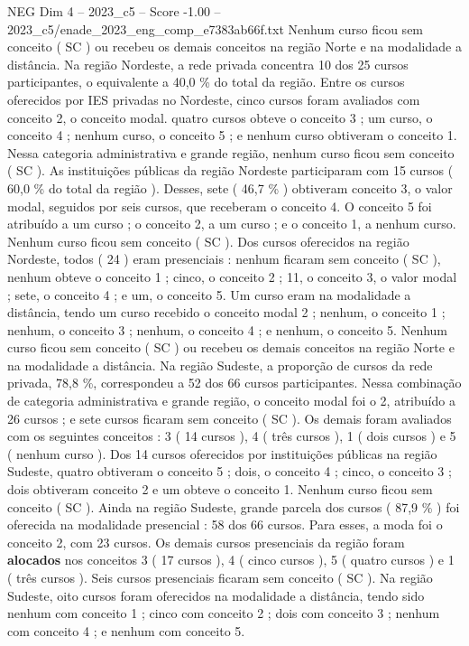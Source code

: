 \begin{textsample}{NEG Dim 4 – 2023\_c5 – Score -1.00 – 2023\_c5/enade\_2023\_eng\_comp\_e7383ab66f.txt}
Nenhum curso ficou sem conceito ( SC ) ou recebeu os demais conceitos na região Norte e na modalidade a distância.
Na região Nordeste, a rede privada concentra 10 dos 25 cursos participantes, o equivalente a 40,0 \% do total da região.
Entre os cursos oferecidos por IES privadas no Nordeste, cinco cursos foram avaliados com conceito 2, o conceito modal. quatro cursos obteve o conceito 3 ; um curso, o conceito 4 ; nenhum curso, o conceito 5 ; e nenhum curso obtiveram o conceito 1.
Nessa categoria administrativa e grande região, nenhum curso ficou sem conceito ( SC ).
As instituições públicas da região Nordeste participaram com 15 cursos ( 60,0 \% do total da região ).
Desses, sete ( 46,7 \% ) obtiveram conceito 3, o valor modal, seguidos por seis cursos, que receberam o conceito 4.
O conceito 5 foi atribuído a um curso ; o conceito 2, a um curso ; e o conceito 1, a nenhum curso.
Nenhum curso ficou sem conceito ( SC ).
Dos cursos oferecidos na região Nordeste, todos ( 24 ) eram presenciais : nenhum ficaram sem conceito ( SC ), nenhum obteve o conceito 1 ; cinco, o conceito 2 ; 11, o conceito 3, o valor modal ; sete, o conceito 4 ; e um, o conceito 5.
Um curso eram na modalidade a distância, tendo um curso recebido o conceito modal 2 ; nenhum, o conceito 1 ; nenhum, o conceito 3 ; nenhum, o conceito 4 ; e nenhum, o conceito 5.
Nenhum curso ficou sem conceito ( SC ) ou recebeu os demais conceitos na região Norte e na modalidade a distância.
Na região Sudeste, a proporção de cursos da rede privada, 78,8 \%, correspondeu a 52 dos 66 cursos participantes.
Nessa combinação de categoria administrativa e grande região, o conceito modal foi o 2, atribuído a 26 cursos ; e sete cursos ficaram sem conceito ( SC ).
Os demais foram avaliados com os seguintes conceitos : 3 ( 14 cursos ), 4 ( três cursos ), 1 ( dois cursos ) e 5 ( nenhum curso ).
Dos 14 cursos oferecidos por instituições públicas na região Sudeste, quatro obtiveram o conceito 5 ; dois, o conceito 4 ; cinco, o conceito 3 ; dois obtiveram conceito 2 e um obteve o conceito 1.
Nenhum curso ficou sem conceito ( SC ).
Ainda na região Sudeste, grande parcela dos cursos ( 87,9 \% ) foi oferecida na modalidade presencial : 58 dos 66 cursos.
Para esses, a moda foi o conceito 2, com 23 cursos.
Os demais cursos presenciais da região foram \textbf{alocados} nos conceitos 3 ( 17 cursos ), 4 ( cinco cursos ), 5 ( quatro cursos ) e 1 ( três cursos ).
Seis cursos presenciais ficaram sem conceito ( SC ).
Na região Sudeste, oito cursos foram oferecidos na modalidade a distância, tendo sido nenhum com conceito 1 ; cinco com conceito 2 ; dois com conceito 3 ; nenhum com conceito 4 ; e nenhum com conceito 5.

\end{textsample}
